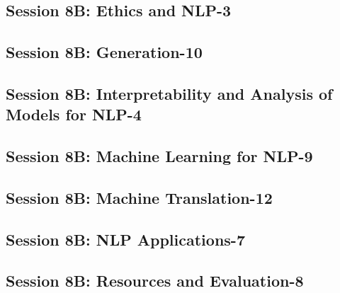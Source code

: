 \subsection{\large Session 8B: Ethics and NLP-3}
\label{parallel-session-8B-trackA}
\TrackALoc\hfill\sessionchair{}{}
\clearpage
\subsection{\large Session 8B: Generation-10}
\label{parallel-session-8B-trackB}
\TrackBLoc\hfill\sessionchair{}{}
\clearpage
\subsection{\large Session 8B: Interpretability and Analysis of Models for NLP-4}
\label{parallel-session-8B-trackC}
\TrackCLoc\hfill\sessionchair{}{}
\clearpage
\subsection{\large Session 8B: Machine Learning for NLP-9}
\label{parallel-session-8B-trackD}
\TrackDLoc\hfill\sessionchair{}{}
\clearpage
\subsection{\large Session 8B: Machine Translation-12}
\label{parallel-session-8B-trackE}
\TrackELoc\hfill\sessionchair{}{}
\clearpage
\subsection{\large Session 8B: NLP Applications-7}
\label{parallel-session-8B-trackF}
\TrackFLoc\hfill\sessionchair{}{}
\clearpage
\subsection{\large Session 8B: Resources and Evaluation-8}
\label{parallel-session-8B-trackG}
\TrackGLoc\hfill\sessionchair{}{}
\clearpage
